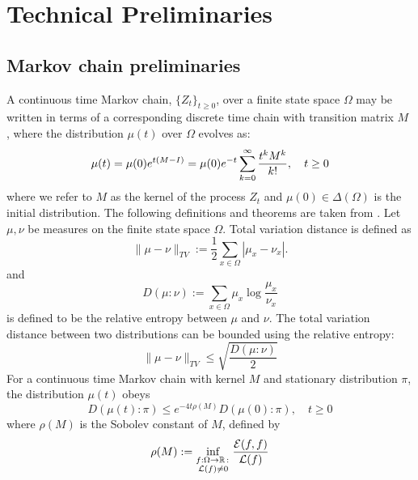 \chapter{Technical Preliminaries}\label{appendixA}

\section{Markov chain preliminaries}\label{a:MchainPrelims}

A continuous time Markov chain, $\{Z_t\}_{t\geq 0}$, over a finite state space $\Omega$ may be written in terms of a corresponding discrete time chain with transition matrix $M$ \cite{Montenegro2006}, where the distribution $\mu(t)$ over $\Omega$ evolves as:\begin{equation}\label{e:contin time chain}
\mu(t) = \mu(0)e^{t(M-I)} = \mu(0)e^{-t}\sum_{k=0}^\infty {t^kM^k\over k!},\quad t\geq 0
\end{equation}
\normalsize
%
where we refer to $M$ as the kernel of the process $Z_t$ and $\mu(0) \in \Delta(\Omega)$ is the initial distribution.  
%
%
The following definitions and theorems are taken from \cite{Shah2010, Montenegro2006}.  Let $\mu,\nu$ be measures on the finite state space $\Omega.$  Total variation distance is defined as 
\begin{equation}\|\mu - \nu\|_{TV} := \frac{1}{2}\sum_{x\in \Omega}|\mu_x - \nu_x|.\end{equation}
and 
\begin{equation}D(\mu:\nu) := \sum_{x\in\Omega}\mu_x\log\frac{\mu_x}{\nu_x}\end{equation}
is defined to be the relative entropy between $\mu$ and $\nu$. The total variation distance between two distributions can be bounded using the relative entropy: 
\begin{equation}\label{measure ineq}\|\mu - \nu\|_{TV}\leq \sqrt{\frac{D(\mu:\nu)}{2}}\end{equation}
For a continuous time Markov chain with kernel $M$ and stationary distribution $\pi$, the distribution $\mu(t)$ obeys
\begin{equation}\label{e:entropy decay}
D(\mu(t):\pi)\leq e^{-4t\rho(M)}D(\mu(0):\pi),\quad t\geq 0
\end{equation}
where $\rho(M)$ is the Sobolev constant of $M$, defined by 
\begin{equation}\label{e:Sobolev const}
\rho(M) := \inf_{\substack{f: \Omega\to \mathbb{R} \,:\, \\ \mathcal{L}(f)\neq 0}}\frac{\mathcal{E}(f,f)}{\mathcal{L}(f)}
\end{equation}

